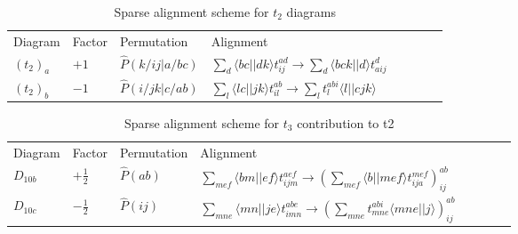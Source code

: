\begin{table}[]
\centering
\caption{Sparse alignment scheme for $t_2$ diagrams}
\label{tab:sparse_alignments_t2}
\begin{tabular}{llllllll}
Diagram  & Factor & Permutation & Alignment   \\
$(t_2)_a$&$+1$& $\hat{P}(k/ij \vert a/bc)$ & $\sum_{d} \langle bc \vert \vert dk \rangle t^{ad}_{ij} \rightarrow \sum_d \langle bck \vert \vert d \rangle t^d_{aij} $ \\
$(t_2)_b$&$-1$& $\hat{P}(i/jk \vert c/ab)$ & $\sum_{l} \langle lc \vert \vert jk \rangle t^{ab}_{il} \rightarrow \sum_l t^{abi}_{l} \langle l \vert \vert cjk \rangle  $  \\
\end{tabular}
\end{table}


\begin{table}[]
\centering
\caption{Sparse alignment scheme for $t_3$ contribution to t2}
\label{tab:sparse_alignments_t3CCD}
\begin{tabular}{llllllll}
Diagram  & Factor & Permutation & Alignment  \\
$D_{10b}$&$+\frac{1}{2}$& $\hat{P}(ab)$ & $\sum_{mef} \langle bm \vert \vert ef \rangle t^{aef}_{ijm} \rightarrow (\sum_{mef} \langle b \vert \vert mef \rangle t^{mef}_{ija})^{ab}_{ij} $  \\
$D_{10c}$&$-\frac{1}{2}$& $\hat{P}(ij)$ & $\sum_{mne} \langle mn \vert \vert je \rangle t^{abe}_{imn} \rightarrow (\sum_{mne} t^{abi}_{mne} \langle mne \vert \vert j \rangle)^{ab}_{ij}  $  \\
\end{tabular}
\end{table}





